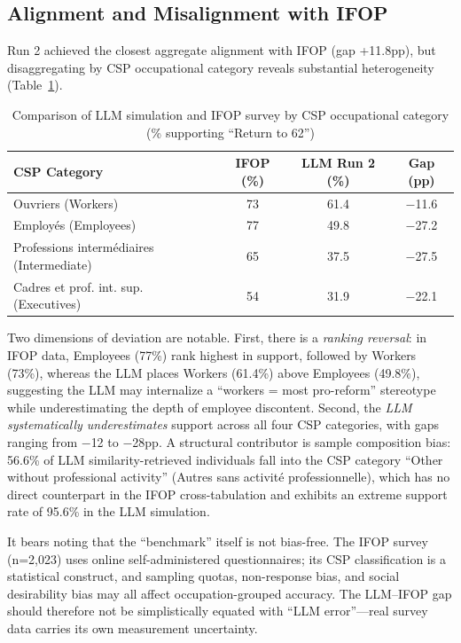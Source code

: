 \documentclass[11pt,a4paper]{article}
\begin{document}
\subsection{Alignment and Misalignment with IFOP}

Run 2 achieved the closest aggregate alignment with IFOP (gap +11.8pp), but disaggregating by CSP occupational category reveals substantial heterogeneity (Table~\ref{tab:occupation_compare}).

\begin{table}[H]
    \centering
    \caption{Comparison of LLM simulation and IFOP survey by CSP occupational category (\% supporting ``Return to 62'')}
    \label{tab:occupation_compare}
    \begin{tabular}{@{}lccc@{}}
        \toprule
        \textbf{CSP Category} & \textbf{IFOP (\%)} & \textbf{LLM Run 2 (\%)} & \textbf{Gap (pp)} \\
        \midrule
        Ouvriers (Workers) & 73 & 61.4 & $-$11.6 \\
        Employ\'es (Employees) & 77 & 49.8 & $-$27.2 \\
        Professions interm\'ediaires (Intermediate) & 65 & 37.5 & $-$27.5 \\
        Cadres et prof. int. sup. (Executives) & 54 & 31.9 & $-$22.1 \\
        \bottomrule
    \end{tabular}
\end{table}

Two dimensions of deviation are notable. First, there is a \textit{ranking reversal}: in IFOP data, Employees (77\%) rank highest in support, followed by Workers (73\%), whereas the LLM places Workers (61.4\%) above Employees (49.8\%), suggesting the LLM may internalize a ``workers = most pro-reform'' stereotype while underestimating the depth of employee discontent. Second, the \textit{LLM systematically underestimates} support across all four CSP categories, with gaps ranging from $-$12 to $-$28pp. A structural contributor is sample composition bias: 56.6\% of LLM similarity-retrieved individuals fall into the CSP category ``Other without professional activity'' (Autres sans activit\'e professionnelle), which has no direct counterpart in the IFOP cross-tabulation and exhibits an extreme support rate of 95.6\% in the LLM simulation.

It bears noting that the ``benchmark'' itself is not bias-free. The IFOP survey (n=2,023) uses online self-administered questionnaires; its CSP classification is a statistical construct, and sampling quotas, non-response bias, and social desirability bias may all affect occupation-grouped accuracy. The LLM--IFOP gap should therefore not be simplistically equated with ``LLM error''---real survey data carries its own measurement uncertainty.
\end{document}
